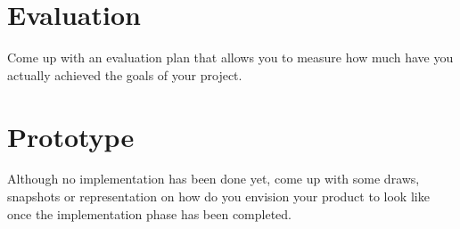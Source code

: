 \section{Evaluation}
Come up with an evaluation plan that allows you to measure how much have you actually achieved the goals of your project. 

\section{Prototype}
Although no implementation has been done yet, come up with some draws, snapshots or representation on how do you envision your product to look like once the implementation phase has been completed.